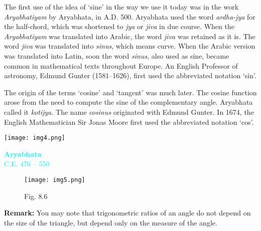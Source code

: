 \documentclass[11pt,a4paper]{article}
\begin{document}
\tcolorbox[colback=white,colframe=cyan, sharp corners, boxrule=0.8pt, width=\textwidth]
\begin{minipage}{0.63\textwidth}
\color{black}
The first use of the idea of ‘sine’ in the way we use it today was in the work \textit{Aryabhatiyam} by Aryabhata, in A.D. 500. Aryabhata used the word \textit{ardha-jya} for the half-chord, which was shortened to \textit{jya} or \textit{jiva} in due course. When the \textit{Aryabhatiyam} was translated into Arabic, the word \textit{jiva} was retained as it is. The word \textit{jiva} was translated into \textit{sinus}, which means curve. When the Arabic version was translated into Latin, soon the word \textit{sinus}, also used as sine, became common in mathematical texts throughout Europe. An English Professor of astronomy, Edmund Gunter (1581–1626), first used the abbreviated notation ‘sin’.

\vspace{0.3cm}

The origin of the terms ‘cosine’ and ‘tangent’ was much later. The cosine function arose from the need to compute the sine of the complementary angle. Aryabhata called it \textit{kotijya}. The name \textit{cosinus} originated with Edmund Gunter. In 1674, the English Mathematician Sir Jonas Moore first used the abbreviated notation ‘cos’. 
\end{minipage}
\hfill
\begin{minipage}{0.33\textwidth}
    \centering
    \texttt{[image: img4.png]} 
    \vspace{0.2cm}
    
    \textcolor{cyan}{\textbf{Aryabhata} \\ \small C.E. 476 -- 550}
\end{minipage}
\endtcolorbox

\vspace{0.5cm}

\begin{wrapfigure}{r}{0.35\textwidth}
    \centering
    \texttt{[image: img5.png]} %
    \caption*{\color{cyan} Fig. 8.6}
\end{wrapfigure}

\noindent \textbf{\color{cyan} Remark:} \color{black} You may note that trigonometric ratios of an angle do not depend on the size of the triangle, but depend only on the measure of the angle.
\end{document}
